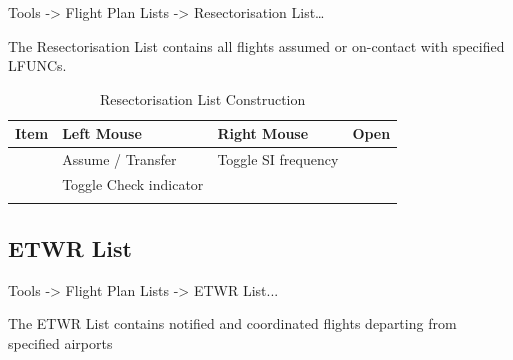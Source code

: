 \documentclass[a4paper,oneside,11pt]{memoir}
\begin{document}
 Tools -> Flight Plan Lists -> Resectorisation List…

\bigskip

The Resectorisation List contains all flights assumed or on-contact with specified LFUNCs.

\begin{longtable}{|p{}|p{}|p{}|} \hline
  \textbf{Item}         & \textbf{Left Mouse}       & \textbf{Right Mouse} \endhead \hline
   & Open      &                      \\ \hline
         & Assume / Transfer         & Toggle SI frequency  \\ \hline
          & Toggle Check indicator    &                      \\ \hline
  \caption{Resectorisation List Construction}
\end{longtable}  

\subsection{ETWR List}
\label{list:etwr}

 Tools -> Flight Plan Lists -> ETWR List...

\bigskip

The ETWR List contains notified and coordinated flights departing from specified airports
\end{document}
